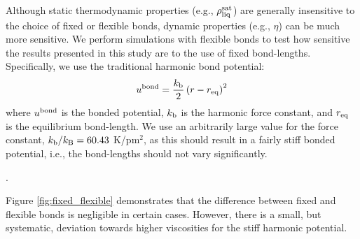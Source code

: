 \documentclass[preprint,review,12pt]{elsarticle}
\begin{document}
	
    Although static thermodynamic properties (e.g., $\rho_{\rm liq}^{\rm sat}$) are generally insensitive to the choice of fixed or flexible bonds, dynamic properties (e.g., $\eta$) can be much more sensitive. We perform simulations with flexible bonds to test how sensitive the results presented in this study are to the use of fixed bond-lengths. Specifically, we use the traditional harmonic bond potential:
    \begin{equation} \label{eq:harmonic_bond}
    u^{\rm bond} = \frac{k_{\rm b}}{2} \left(r-r_{\rm eq}\right)^2
    \end{equation}
    where $u^{\rm bond}$ is the bonded potential, $k_{\rm b}$ is the harmonic force constant, and $r_{\rm eq}$ is the equilibrium bond-length. We use an arbitrarily large value for the force constant, $k_{\rm b}/k_{\rm B} = 60.43$ K/pm$^2$, as this should result in a fairly stiff bonded potential, i.e., the bond-lengths should not vary significantly.
    
    . %
    
    Figure \ref{fig:fixed_flexible} demonstrates that the difference between fixed and flexible bonds is negligible in certain cases. However, there is a small, but systematic, deviation towards higher viscosities for the stiff harmonic potential. 
    
\end{document}

